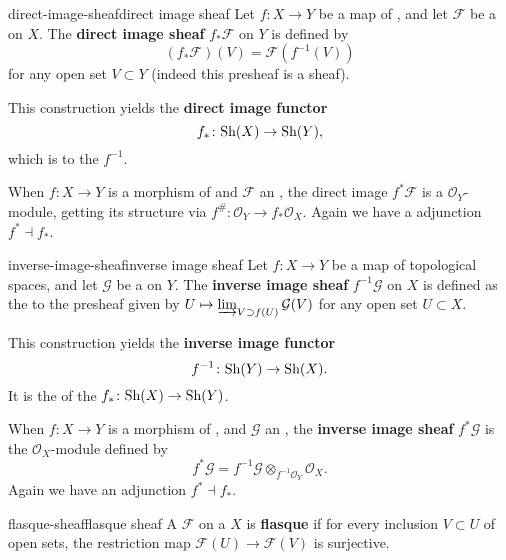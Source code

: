\begin{topic}{direct-image-sheaf}{direct image sheaf}
    Let $f \colon X \to Y$ be a map of , and let $\mathcal{F}$ be a  on $X$. The \textbf{direct image sheaf} $f_* \mathcal{F}$ on $Y$ is defined by
    \[ (f_* \mathcal{F})(V) = \mathcal{F}(f^{-1}(V)) \]
    for any open set $V \subset Y$ (indeed this presheaf is a sheaf).
    
    This construction yields the \textbf{direct image functor}
    \[ f_* \colon \textup{Sh}(X) \to \textup{Sh}(Y) , \]
    which is  to the  $f^{-1}$.
    
    When $f \colon X \to Y$ is a morphism of  and $\mathcal{F}$ an , the direct image $f^* \mathcal{F}$ is a $\mathcal{O}_Y$-module, getting its structure via $f^\# \colon \mathcal{O}_Y \to f_* \mathcal{O}_X$. Again we have a adjunction $f^* \dashv f_*$.
\end{topic}

\begin{topic}{inverse-image-sheaf}{inverse image sheaf}
    Let $f \colon X \to Y$ be a map of topological spaces, and let $\mathcal{G}$ be a  on $Y$. The \textbf{inverse image sheaf} $f^
    {-1}\mathcal{G}$ on $X$ is defined as the  to the presheaf given by $U \mapsto \varinjlim_{V \supset f(U)} \mathcal{G}(V)$ for any open set $U \subset X$.
    
    This construction yields the \textbf{inverse image functor}
    \[ f^{-1} \colon \textup{Sh}(Y) \to \textup{Sh}(X) . \]
    It is the  of the  $f_* \colon \textup{Sh}(X) \to \textup{Sh}(Y)$.
    
    When $f \colon X \to Y$ is a morphism of , and $\mathcal{G}$ an , the \textbf{inverse image sheaf} $f^* \mathcal{G}$ is the $\mathcal{O}_X$-module defined by
    \[ f^* \mathcal{G} = f^{-1} \mathcal{G} \otimes_{f^{-1} \mathcal{O}_Y} \mathcal{O}_X . \]
    Again we have an adjunction $f^* \dashv f_*$.
\end{topic}

\begin{topic}{flasque-sheaf}{flasque sheaf}
    A  $\mathcal{F}$ on a  $X$ is \textbf{flasque} if for every inclusion $V \subset U$ of open sets, the restriction map $\mathcal{F}(U) \to \mathcal{F}(V)$ is surjective.
\end{topic}

